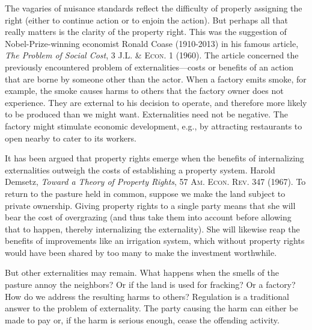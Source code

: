 
The vagaries of nuisance standards reflect the difficulty of properly assigning
the right (either to continue action or to enjoin the action). But perhaps all
that really matters is the clarity of the property right. This was the
suggestion of Nobel-Prize-winning economist Ronald Coase (1910-2013) in his
famous article, \textit{The Problem of Social Cost}, 3 \textsc{J.L. \& Econ}. 1
(1960). The article concerned the previously encountered problem of
externalities---costs or benefits of an action that are borne by someone other
than the actor. When a factory emits smoke, for example, the smoke causes harms
to others that the factory owner does not experience. They are external to his
decision to operate, and therefore more likely to be produced than we might
want. Externalities need not be negative. The factory might stimulate economic
development, e.g., by attracting restaurants to open nearby to cater to its
workers. 

It has been argued that property rights emerge when the benefits of
internalizing externalities outweigh the costs of establishing a property
system. Harold Demsetz, \textit{Toward a Theory of Property Rights}, 57
\textsc{Am. Econ. Rev.} 347 (1967). To return to the pasture held in common,
suppose we make the land subject to private ownership. Giving property rights to
a single party means that she will bear the cost of overgrazing (and thus take
them into account before allowing that to happen, thereby internalizing the
externality). She will likewise reap the benefits of improvements like an
irrigation system, which without property rights would have been shared by too
many to make the investment worthwhile.

But other externalities may remain. What happens when the smells of the pasture
annoy the neighbors? Or if the land is used for fracking? Or a factory? How do
we address the resulting harms to others? Regulation is a traditional answer to
the problem of externality. The party causing the harm can either be made to pay
or, if the harm is serious enough, cease the offending activity.


